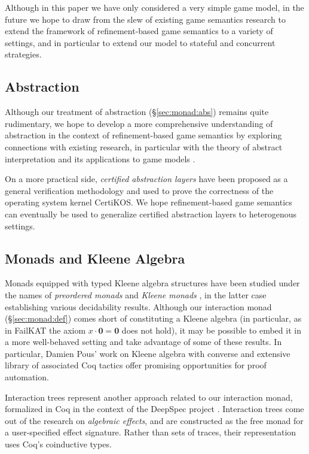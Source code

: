 \documentclass[sigplan,10pt,review,anonymous]{acmart}
\begin{document}
Although in this paper we have only considered a very simple game model,
in the future we hope to draw from the slew of existing game semantics research
to extend the framework of refinement-based game semantics
to a variety of settings,
and in particular to extend our model
to stateful and concurrent strategies.


\subsection{Abstraction} %

Although our treatment of abstraction (\S\ref{sec:monad:abs})
remains quite rudimentary,
we hope to develop a more comprehensive understanding
of abstraction in the context of refinement-based game semantics
by exploring connections with existing research,
in particular with
the theory of abstract interpretation \cite{absint,aif}
and its applications to game models \cite{aigp}.

On a more practical side,
\emph{certified abstraction layers} \cite{popl15,osdi16,ccal}
have been proposed as a general verification methodology
and used to prove the correctness of the operating system kernel CertiKOS.
We hope refinement-based game semantics
can eventually be used to generalize
certified abstraction layers to heterogenous settings.


\subsection{Monads and Kleene Algebra} %

Monads equipped with
typed Kleene algebra structures
have been studied under the names of
\emph{preordered monads} \cite{pom} and
\emph{Kleene monads} \cite{kleenem},
in the latter case establishing various decidability results.
Although our interaction monad (\S\ref{sec:monad:def})
comes short of constituting a Kleene algebra
(in particular, as in FailKAT \cite{failkat}
the axiom $x \cdot \mathbf{0} = \mathbf{0}$ does not hold),
it may be possible to embed it in a more well-behaved setting
and take advantage of some of these results.
In particular,
Damien Pous' work on Kleene algebra with converse
and extensive library of associated Coq tactics
offer promising opportunities for proof automation.

Interaction trees \cite{itrees}
represent another approach
related to our interaction monad,
formalized in Coq in the context of the DeepSpec project \cite{deepspec}.
Interaction trees
come out of the research on \emph{algebraic effects},
and are constructed as the free monad
for a user-specified effect signature.
Rather than sets of traces,
their representation uses Coq's coinductive types.
\end{document}
